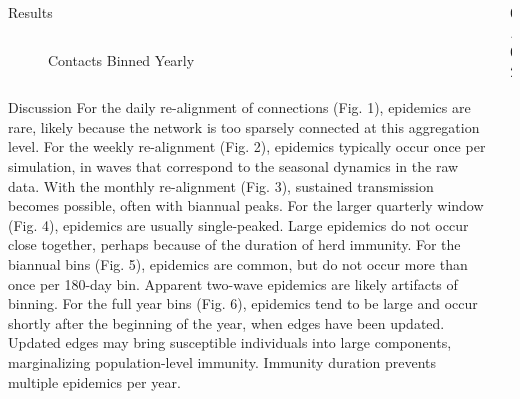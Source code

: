 \documentclass[final]{beamer} %
\newcommand{\spaceProp}{0.02}
\newcommand{\spacer}{\begin{column}{\spaceProp\paperwidth}\end{column}}
\newenvironment{oneCol}{\begin{column}[t]{0.225\paperwidth}}{\end{column}}
\newenvironment{threeCol}{\begin{column}[t]{0.715\paperwidth}}{\end{column}}
\begin{document}
\begin{frame}{}
\begin{columns}[t]
\begin{threeCol}
\begin{block}{Results}
\begin{columns}
\begin{oneCol}
\begin{figure}
        \caption{Contacts Binned Yearly}
      \end{figure}  
    \end{oneCol}
    \end{columns}
    \end{block}
    \begin{block}{Discussion}
    For the daily re-alignment of connections (Fig. 1), epidemics are rare, likely because the network is too sparsely connected at this aggregation level.  For the weekly re-alignment (Fig. 2), epidemics typically occur once per simulation, in waves that correspond to the seasonal dynamics in the raw data.  With the monthly re-alignment (Fig. 3), sustained transmission becomes possible, often with biannual peaks.  For the larger quarterly window (Fig. 4), epidemics are usually single-peaked. Large epidemics do not occur close together, perhaps because of the duration of herd immunity.  For the biannual bins (Fig. 5), epidemics are common, but do not occur more than once per 180-day bin. Apparent two-wave epidemics are likely artifacts of binning.  For the full year bins (Fig. 6), epidemics tend to be large and occur shortly after the beginning of the year, when edges have been updated. Updated edges may bring susceptible individuals into large components, marginalizing population-level immunity. Immunity duration prevents multiple epidemics per year.
    \end{block}
    \end{threeCol}
    \spacer{}
    \end{columns}
  \end{frame}
  
\end{document}
